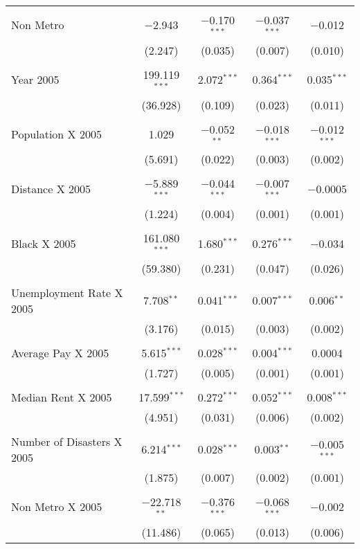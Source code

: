 \documentclass[]{article}
\begin{document}
\begin{table}[!htbp]
\begin{tabular}{@{\extracolsep{5pt}}lcccc}
  & & & & \\ 
 Non Metro & $-$2.943 & $-$0.170$^{***}$ & $-$0.037$^{***}$ & $-$0.012 \\ 
  & (2.247) & (0.035) & (0.007) & (0.010) \\ 
  & & & & \\ 
 Year 2005 & 199.119$^{***}$ & 2.072$^{***}$ & 0.364$^{***}$ & 0.035$^{***}$ \\ 
  & (36.928) & (0.109) & (0.023) & (0.011) \\ 
  & & & & \\ 
 Population X 2005 & 1.029 & $-$0.052$^{**}$ & $-$0.018$^{***}$ & $-$0.012$^{***}$ \\ 
  & (5.691) & (0.022) & (0.003) & (0.002) \\ 
  & & & & \\ 
 Distance X 2005 & $-$5.889$^{***}$ & $-$0.044$^{***}$ & $-$0.007$^{***}$ & $-$0.0005 \\ 
  & (1.224) & (0.004) & (0.001) & (0.001) \\ 
  & & & & \\ 
 Black X 2005 & 161.080$^{***}$ & 1.680$^{***}$ & 0.276$^{***}$ & $-$0.034 \\ 
  & (59.380) & (0.231) & (0.047) & (0.026) \\ 
  & & & & \\ 
 Unemployment Rate X 2005  & 7.708$^{**}$ & 0.041$^{***}$ & 0.007$^{***}$ & 0.006$^{**}$ \\ 
  & (3.176) & (0.015) & (0.003) & (0.002) \\ 
  & & & & \\ 
 Average Pay X 2005 & 5.615$^{***}$ & 0.028$^{***}$ & 0.004$^{***}$ & 0.0004 \\ 
  & (1.727) & (0.005) & (0.001) & (0.001) \\ 
  & & & & \\ 
 Median Rent X 2005 & 17.599$^{***}$ & 0.272$^{***}$ & 0.052$^{***}$ & 0.008$^{***}$ \\ 
  & (4.951) & (0.031) & (0.006) & (0.002) \\ 
  & & & & \\ 
 Number of Disasters X 2005 & 6.214$^{***}$ & 0.028$^{***}$ & 0.003$^{**}$ & $-$0.005$^{***}$ \\ 
  & (1.875) & (0.007) & (0.002) & (0.001) \\ 
  & & & & \\ 
 Non Metro X 2005 & $-$22.718$^{**}$ & $-$0.376$^{***}$ & $-$0.068$^{***}$ & $-$0.002 \\ 
  & (11.486) & (0.065) & (0.013) & (0.006) \\ 

\end{tabular}
\end{table}
\end{document}
